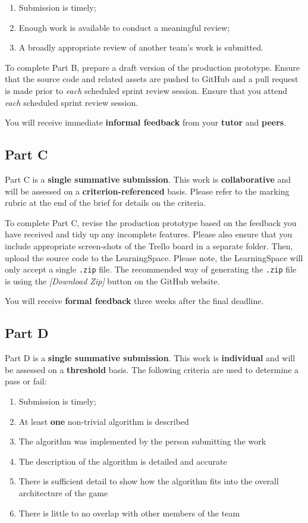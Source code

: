 \documentclass{../fal_assignment}
\begin{document}
\begin{enumerate}[label=(\alph*)]
	\item Submission is timely;
	\item Enough work is available to conduct a meaningful review;
	\item A broadly appropriate review of another team's work is submitted.
\end{enumerate}

To complete Part B, prepare a draft version of the production prototype. Ensure that the source code and related assets are pushed to GitHub and a pull request is made prior to \textit{each} scheduled sprint review session. Ensure that you attend \textit{each} scheduled sprint review session.

You will receive immediate \textbf{informal feedback} from your \textbf{tutor} and \textbf{peers}.

\subsection*{Part C}

Part C is a \textbf{single summative submission}. This work is \textbf{collaborative} and will be assessed on a \textbf{criterion-referenced} basis. Please refer to the marking rubric at the end of the brief for details on the criteria.

To complete Part C, revise the production prototype based on the feedback you have received and tidy up any incomplete features. Please also ensure that you include appropriate screen-shots of the Trello board in a separate folder. Then, upload the source code to the LearningSpace. Please note, the LearningSpace will only accept a single \texttt{.zip} file. The recommended way of generating the \texttt{.zip} file is using the \textit{[Download Zip]} button on the GitHub website.

You will receive \textbf{formal feedback} three weeks after the final deadline.

\subsection*{Part D}

Part D is a \textbf{single summative submission}. This work is \textbf{individual} and will be assessed on a \textbf{threshold} basis. The following criteria are used to determine a pass or fail:

\begin{enumerate}[label=(\alph*)]
	\item Submission is timely;
	\item At least \textbf{one} non-trivial algorithm is described
	\item The algorithm was implemented by the person submitting the work
	\item The description of the algorithm is detailed and accurate
	\item There is sufficient detail to show how the algorithm fits into the overall architecture of the game
	\item There is little to no overlap with other members of the team
\end{enumerate}
\end{document}
